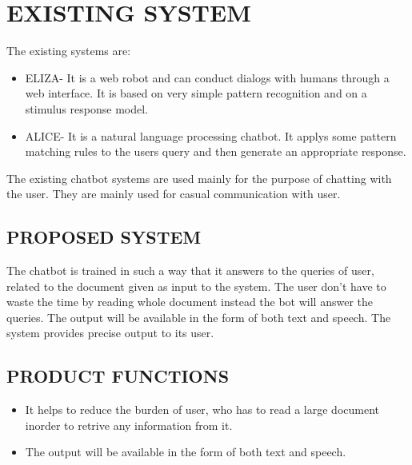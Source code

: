 \documentclass[12pt,a4paper,oneside]{report}
\begin{document}

\section {EXISTING SYSTEM}
The existing systems are:
\begin{itemize}
\item ELIZA- It is a web robot and can conduct dialogs with humans through a web interface. It is based on very simple pattern recognition and on a stimulus response model.
\item ALICE- It is a natural language processing chatbot. It applys some pattern matching rules to the users query and then generate an appropriate response.
\end{itemize}
\par  The existing chatbot systems are used mainly for the purpose of chatting with the user. They are mainly used for casual communication with user. 

\subsection {PROPOSED SYSTEM}
The chatbot is trained in such a way that it answers to the queries of user, related to the document given as input to the system. The user don't have to waste the time by reading whole document instead the bot will answer the queries. The output will be available in the form of both text and speech. The system provides precise output to its user.
\subsection {PRODUCT FUNCTIONS}
\begin{itemize}
 \item It helps to reduce the burden of user, who has to read a large document inorder to retrive any information from it.
 
\item The output will be available in the form of both text and speech.
\end{itemize}
\end{document}
